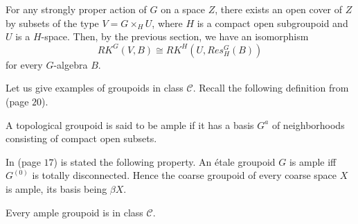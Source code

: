 \begin{rk}
For any strongly proper action of $G$ on a space $Z$, there exists an open cover of $Z$ by subsets of the type $V=G\times_H U$, where $H$ is a compact open subgroupoid and $U$ is a $H$-space. Then, by the previous section, we have an isomorphism
\[RK^G(V,B)\cong RK^H(U, Res_H^G (B))\]
for every $G$-algebra $B$. 
\end{rk}

Let us give examples of groupoids in class $\mathcal C$. Recall the following definition from \cite{Renault} (page $20$).

\begin{definition}
A topological groupoid is said to be ample if it has a basis $G^a$ of neighborhoods consisting of compact open subsets.
\end{definition}

In \cite{paterson} (page $17$) is stated the following property. An étale groupoid $G$ is ample iff $G^{(0)}$ is totally disconnected. Hence the coarse groupoid of every coarse space $X$ is ample, its basis being $\beta X$.

\begin{prop}
Every ample groupoid is in class $\mathcal C$.
\end{prop}


